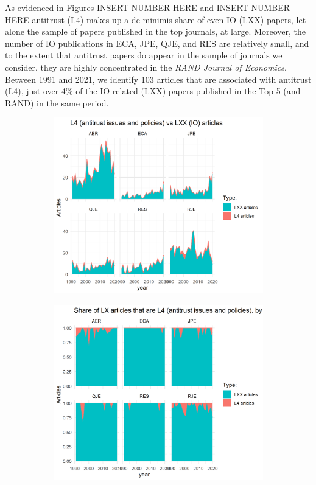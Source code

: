 \documentclass[11pt, letterpaper, twoside]{article}
\begin{document}
As evidenced in Figures INSERT NUMBER HERE and INSERT NUMBER HERE antitrust (L4) makes up a de minimis share of even IO (LXX) papers, let alone the sample of papers published in the top journals, at large. Moreover, the number of IO publications in ECA, JPE, QJE, and RES are relatively small, and to the extent that antitrust papers do appear in the sample of journals we consider, they are highly concentrated in the \textit{RAND Journal of Economics}. Between 1991 and 2021, we identify 103 articles that are associated with antitrust (L4), just over 4\% of the IO-related (LXX) papers published in the Top 5 (and RAND) in the same period.


\begin{figure}
    \begin{subfigure}[h]{0.49\textwidth}
        \centering
        \includegraphics[width=\textwidth]{L4-vs-LXX-by-journal.png}
    \end{subfigure}
    \hfill
    \begin{subfigure}[h]{0.49\textwidth}
        \centering
        \includegraphics[width=\textwidth]{L4-vs-LXX-normalized-by_journal.png}
    \end{subfigure}
\end{figure}
\end{document}
